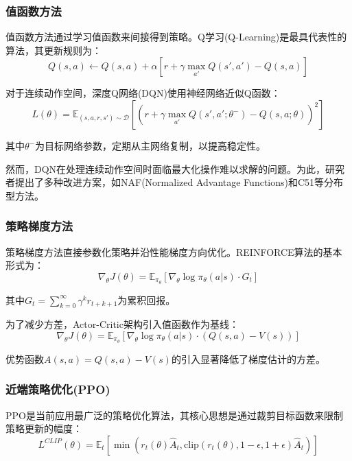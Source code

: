 \documentclass[12pt,a4paper]{ctexart}
\begin{document}
\subsubsection{值函数方法}

值函数方法通过学习值函数来间接得到策略。Q学习(Q-Learning)是最具代表性的算法，其更新规则为：
\begin{equation}
    Q(s,a) \leftarrow Q(s,a) + \alpha[r + \gamma \max_{a'}Q(s',a') - Q(s,a)]
\end{equation}

对于连续动作空间，深度Q网络(DQN)使用神经网络近似Q函数：
\begin{equation}
    L(\theta) = \mathbb{E}_{(s,a,r,s') \sim \mathcal{D}}[(r + \gamma \max_{a'}Q(s',a';\theta^-) - Q(s,a;\theta))^2]
\end{equation}

其中$\theta^-$为目标网络参数，定期从主网络复制，以提高稳定性。

然而，DQN在处理连续动作空间时面临最大化操作难以求解的问题。为此，研究者提出了多种改进方案，如NAF(Normalized Advantage Functions)和C51等分布型方法。

\subsubsection{策略梯度方法}

策略梯度方法直接参数化策略并沿性能梯度方向优化。REINFORCE算法的基本形式为：
\begin{equation}
    \nabla_\theta J(\theta) = \mathbb{E}_{\pi_\theta}[\nabla_\theta \log \pi_\theta(a|s) \cdot G_t]
\end{equation}

其中$G_t = \sum_{k=0}^{\infty} \gamma^k r_{t+k+1}$为累积回报。

为了减少方差，Actor-Critic架构引入值函数作为基线：
\begin{equation}
    \nabla_\theta J(\theta) = \mathbb{E}_{\pi_\theta}[\nabla_\theta \log \pi_\theta(a|s) \cdot (Q(s,a) - V(s))]
\end{equation}

优势函数$A(s,a) = Q(s,a) - V(s)$的引入显著降低了梯度估计的方差。

\subsubsection{近端策略优化(PPO)}

PPO是当前应用最广泛的策略优化算法，其核心思想是通过裁剪目标函数来限制策略更新的幅度：
\begin{equation}
    L^{CLIP}(\theta) = \mathbb{E}_t\left[\min\left(r_t(\theta)\hat{A}_t, \text{clip}(r_t(\theta), 1-\epsilon, 1+\epsilon)\hat{A}_t\right)\right]
\end{equation}
\end{document}
